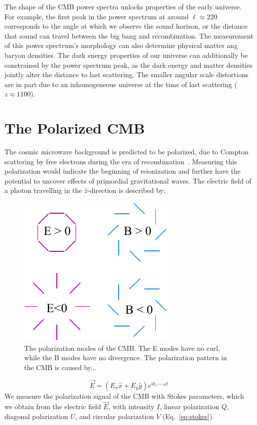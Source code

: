 The shape of the CMB power spectra unlocks properties of the early universe.  For example, the first peak in the power spectrum at around $\ell\approx220$ corresponds to the angle at which we observe the sound horizon, or the distance that sound can travel between the big bang and recombination.  The measurement of this power spectrum's morphology can also determine physical matter ang baryon densities.  The dark energy properties of our universe can additionally be constrained by the power spectrum peak, as the dark energy and matter densities jointly alter the distance to last scattering.  The smaller angular scale distortions are in part due to an inhomogeneous universe at the time of last scattering ($z\approx 1100$). 

\section{The Polarized CMB}
The cosmic microwave background is predicted to be polarized, due to Compton scattering by free electrons during the era of recombination~\cite{}.  Measuring this polarization would indicate the beginning of reionization and further have the potential to uncover effects of primordial gravitational waves.  The electric field of a photon travelling in the $\hat{z}$-direction is described by:
\begin{figure}
    \centering
    \includegraphics[width = .45\textwidth]{Figures/EB_pol.pdf}
    \caption{The polarization modes of the CMB.  The E modes have no curl, while the B modes have no divergence.  The polarization pattern in the CMB is caused by...}
    \label{fig:e_b_pol}
\end{figure}
\begin{equation}
    \Vec{E} = (E_x\hat{x} + E_y\hat{y})e^{i k_z - \omega t }
\end{equation}
We measure the polarization signal of the CMB with Stokes parameters, which we obtain from the electric field $\Vec{E}$, with intensity $I$, linear polarization $Q$, diagonal polarization $U$, and circular polarization $V$ (Eq.~\ref{eq:stokes}).

